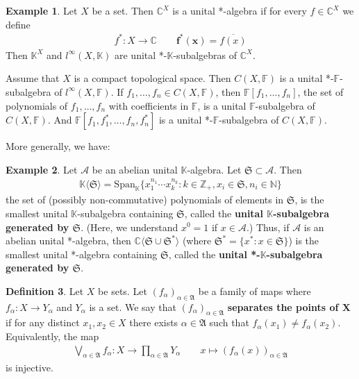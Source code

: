 \documentclass[12pt,b5paper,notitlepage]{article}
\theoremstyle{definition}
\newtheorem{df}{Definition}[subsection]
\newtheorem{eg}[df]{Example}
\theoremstyle{plain}
\newcommand{\fk}{\mathfrak}
\newcommand{\ovl}{\overline}
\newcommand{\Span}{\mathrm{Span}}
\newcommand{\bk}[1]{\langle {#1}\rangle}
\newcommand{\scr}{\mathscr}
\newcommand{\Kbb}{\mathbb K}
\newcommand{\Cbb}{\mathbb C}
\newcommand{\Nbb}{\mathbb N}
\newcommand{\Zbb}{\mathbb Z}
\newcommand{\Fbb}{\mathbb F}
\newcommand{\hqed}{\hfill\qedsymbol}
\numberwithin{equation}{section}
\begin{document}
\begin{eg}
Let $X$ be a set. Then $\Cbb^X$ is a unital *-algebra if for every $f\in\Cbb^X$ we define \index{f@$f^*(x)=\ovl{f(x)}$}
\begin{align}\label{eq33}
f^*:X\rightarrow\Cbb\qquad \pmb{f^*(x)}=\ovl{f(x)}
\end{align}
Then $\Kbb^X$ and $l^\infty(X,\Kbb)$ are unital *-$\Kbb$-subalgebras of $\Cbb^X$.

Assume that $X$ is a compact topological space. Then $C(X,\Fbb)$ is a unital *-$\Fbb$-subalgebra of $l^\infty(X,\Fbb)$. If $f_1,\dots,f_n\in C(X,\Fbb)$, then $\Fbb[f_1,\dots,f_n]$, the set of polynomials of $f_1,\dots,f_n$ with coefficients in $\Fbb$, is a unital $\Fbb$-subalgebra of $C(X,\Fbb)$. And $\Fbb[f_1,f_1^*,\dots,f_n,f_n^*]$ is a unital *-$\Fbb$-subalgebra of $C(X,\Fbb)$.  \hqed
\end{eg}


More generally, we have:

\begin{eg}
Let $\scr A$ be an abelian unital $\Kbb$-algebra. Let $\fk S\subset\scr A$. Then \index{FS@$\Kbb\bk{\fk S}$}
\begin{align}
\Kbb\bk{\fk S}=\Span_\Kbb\{x_1^{n_1}\cdots x_k^{n_k}:k\in\Zbb_+,x_i\in\fk S,n_i\in\Nbb\}
\end{align}
the set of (possibly non-commutative) polynomials of elements in $\fk S$, is the smallest unital $\Kbb$-subalgebra containing $\fk S$, called the \textbf{unital $\Kbb$-subalgebra generated by $\fk S$}.  (Here, we understand $x^0=1$ if $x\in\scr A$.) Thus, if $\scr A$ is an abelian unital *-algebra, then $\Cbb\bk{\fk S\cup\fk S^*}$ (where $\fk S^*=\{x^*:x\in\fk S\}$) is the smallest unital *-algebra containing $\fk S$, called the \textbf{unital *-$\Kbb$-subalgebra generated by $\fk S$}.
\end{eg}



\begin{df}
Let $X$ be sets. Let $(f_\alpha)_{\alpha\in\fk A}$ be a family of maps where $f_\alpha:X\rightarrow Y_\alpha$ and $Y_\alpha$ is a set.  We say that $(f_\alpha)_{\alpha\in\fk A}$ \textbf{separates the points of $\pmb X$}  if for any distinct $x_1,x_2\in X$ there exists $\alpha\in\fk A$ such that $f_\alpha(x_1)\neq f_\alpha(x_2)$. Equivalently, the map
\begin{gather}
\bigvee_{\alpha\in\fk A}f_\alpha:X\rightarrow \prod_{\alpha\in\fk A}Y_\alpha\qquad x\mapsto (f_\alpha(x))_{\alpha\in\fk A}
\end{gather}
is injective.
\end{df}
\end{document}
